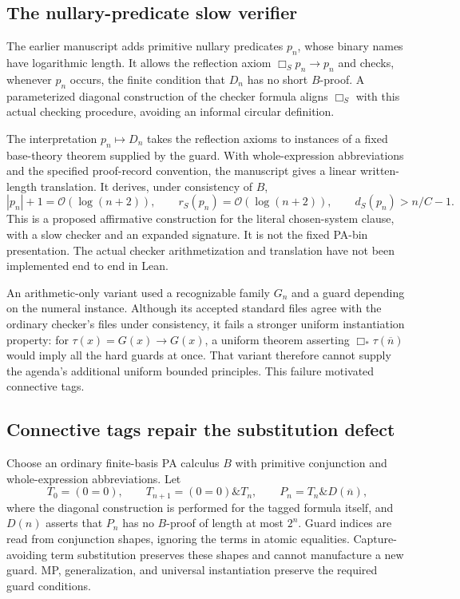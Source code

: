 \documentclass[11pt]{article}
\theoremstyle{definition}
\theoremstyle{remark}
\newcommand{\num}[1]{\overline{#1}}
\newcommand{\cO}{\mathcal O}
\begin{document}
\subsection{The nullary-predicate slow verifier}
The earlier manuscript adds primitive nullary predicates $p_n$, whose binary
names have logarithmic length. It allows the reflection axiom
$\Box_Sp_n\to p_n$ and checks, whenever $p_n$ occurs, the finite condition
that $D_n$ has no short $B$-proof. A parameterized diagonal construction of
the checker formula aligns $\Box_S$ with this actual checking procedure,
avoiding an informal circular definition.

The interpretation $p_n\mapsto D_n$ takes the reflection axioms to instances
of a fixed base-theory theorem supplied by the guard. With whole-expression
abbreviations and the specified proof-record convention, the manuscript gives
a linear written-length translation. It derives, under consistency of $B$,
\[
 |p_n|+1=\cO(\log(n+2)),\qquad
 r_S(p_n)=\cO(\log(n+2)),\qquad d_S(p_n)>n/C-1.
\]
This is a proposed affirmative construction for the literal chosen-system
clause, with a slow checker and an expanded signature. It is not the fixed
PA-bin presentation. The actual checker arithmetization and translation have
not been implemented end to end in Lean.

An arithmetic-only variant used a recognizable family $G_n$ and a guard
depending on the numeral instance. Although its accepted standard files agree
with the ordinary checker's files under consistency, it fails a stronger
uniform instantiation property: for $\tau(x)=G(x)\to G(x)$, a uniform theorem
asserting $\Box_*\tau(\num n)$ would imply all the hard guards at once.
That variant therefore cannot supply the agenda's additional uniform bounded
principles. This failure motivated connective tags.

\subsection{Connective tags repair the substitution defect}
Choose an ordinary finite-basis PA calculus $B$ with primitive conjunction
and whole-expression abbreviations. Let
\[
 T_0=(0=0),\qquad T_{n+1}=(0=0)\mathbin{\&}T_n,
 \qquad P_n=T_n\mathbin{\&}D(\num n),
\]
where the diagonal construction is performed for the tagged formula itself,
and $D(n)$ asserts that $P_n$ has no $B$-proof of length at most $2^n$.
Guard indices are read from conjunction shapes, ignoring the terms in atomic
equalities. Capture-avoiding term substitution preserves these shapes and
cannot manufacture a new guard. MP, generalization, and universal
instantiation preserve the required guard conditions.
\end{document}
